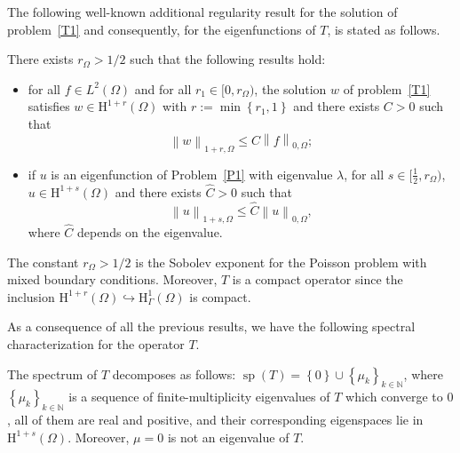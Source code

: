 \documentclass[onefignum,onetabnum,final]{siamart250211}
\numberwithin{equation}{section}
\newcommand\0{\boldsymbol{0}}
\newcommand\N{\mathbb{N}}
\renewcommand\O{\Omega}
\newcommand\G{\Gamma}
\renewcommand\H{\mathrm{H}}
\newcommand\HcuO{\H_{\G}^1(\O)}
\newcommand\HurO{\H^{1+r}(\O)}
\newcommand\HusO{\H^{1+s}(\O)}
\renewcommand\sp{\mathop{\mathrm{sp}}\nolimits}
\def\l{\lambda}
\begin{document}
	The following well-known additional regularity result for the solution of
	problem~\eqref{T1} and consequently, for the eigenfunctions of $T$,
	is stated as follows.
	
	
	\begin{lemma}
		\label{LEM:REG}
		There exists $r_{\O}>1/2$ such that the following results hold:
		\begin{itemize}
			\item[i)] for all $f\in L^2(\O)$ and for all $r_1\in[0,r_\O)$, the
			solution $w$ of problem~\eqref{T1} satisfies $w\in\HurO$ with
			$r:=\min\left\{r_1,1\right\}$ and there exists $C>0$ such that
			$$
			\left\|w\right\|_{1+r,\O}
			\le C\left\|f\right\|_{0,\O};
			$$
			\item[ii)] if $u$ is an eigenfunction of Problem~\ref{P1} with
			eigenvalue $\l$, for all $s\in[\frac12,r_\O)$, $u\in\HusO$ and there
			exists $\widehat{C}>0$ such that
			$$
			\left\|u\right\|_{1+s,\O}
			\le \widehat{C}\left\|u\right\|_{0,\O},
			$$
			where $\widehat{C}$ depends on the eigenvalue.
		\end{itemize}
	\end{lemma}
	\begin{remark}
		The constant $r_{\O}>1/2$ is the Sobolev exponent for the Poisson
		problem with mixed boundary conditions.
		Moreover, $T$ is a compact operator since the
		inclusion $\HurO\hookrightarrow\HcuO$ is compact.
	\end{remark}
	
	
	As a consequence of all the previous results, we have the following spectral
	characterization for the operator $T$.
	
	\begin{theorem}
		\label{CHAR_SP}
		The spectrum of $T$ decomposes as follows:
		$\sp(T)=\left\{0\right\}\cup\left\{\mu_k\right\}_{k\in\N}$, where
		$\left\{\mu_k\right\}_{k\in\N}$ is a
		sequence of finite-multiplicity eigenvalues of $T$ which converge to $0$,
		all of them are real and positive,
		and their corresponding eigenspaces lie in $\HusO$. Moreover, $\mu=0$ is not an eigenvalue of $T$.
	\end{theorem}
	
\end{document}

